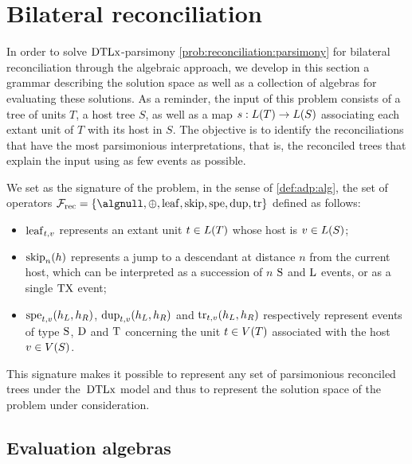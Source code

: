 \section{Bilateral reconciliation}\label{sec:adp-rec:bilateral}

In order to solve \(\mathrm{D}\mathrm{T}\mathrm{L}\mathrm{x}\)-parsimony \cref{prob:reconciliation:parsimony} for bilateral reconciliation through the algebraic approach, we develop in this section a grammar describing the solution space as well as a collection of algebras for evaluating these solutions.
As a reminder, the input of this problem consists of a tree of units \(T\), a host tree \(S\), as well as a map \(s : L(T) \rightarrow L(S)\) associating each extant unit of \(T\) with its host in \(S\).
The objective is to identify the reconciliations that have the most parsimonious interpretations, that is, the reconciled trees that explain the input using as few events as possible.

We set as the signature of the problem, in the sense of \cref{def:adp:alg}, the set of operators \(\algsignrec = \{\algnull, \algplus, \evLeaf, \evSkip, \evSpe, \evDup, \evTr\}\) defined as follows:
\begin{itemize}
    \item \(\mathrm{leaf}_{t,v}\) represents an extant unit \(t \in L(T)\) whose host is \(v \in L(S)\);
    \item \(\mathrm{skip}_n(h)\) represents a jump to a descendant at distance \(n\) from the current host, which can be interpreted as a succession of \(n\) \(\mathrm{S}\) and \(\mathrm{L}\) events, or as a single \(\mathrm{TX}\) event;
    \item \(\mathrm{spe}_{t,v}(h_L, h_R)\), \(\mathrm{dup}_{t,v}(h_L, h_R)\) and \(\mathrm{tr}_{t,v}(h_L, h_R)\) respectively represent events of type \(\mathrm{S}\), \(\mathrm{D}\) and \(\mathrm{T}\) concerning the unit \(t \in V(T)\) associated with the host \(v \in V(S)\).
\end{itemize}

This signature makes it possible to represent any set of parsimonious reconciled trees under the~\(\mathrm{D}\mathrm{T}\mathrm{L}\mathrm{x}\) model and thus to represent the solution space of the problem under consideration.

\subsection{Evaluation algebras}

